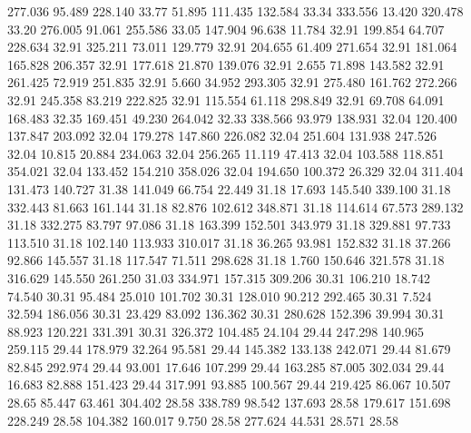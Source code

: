  277.036   95.489  228.140        33.77
  51.895  111.435  132.584        33.34
 333.556   13.420  320.478        33.20
 276.005   91.061  255.586        33.05
 147.904   96.638   11.784        32.91
 199.854   64.707  228.634        32.91
 325.211   73.011  129.779        32.91
 204.655   61.409  271.654        32.91
 181.064  165.828  206.357        32.91
 177.618   21.870  139.076        32.91
   2.655   71.898  143.582        32.91
 261.425   72.919  251.835        32.91
   5.660   34.952  293.305        32.91
 275.480  161.762  272.266        32.91
 245.358   83.219  222.825        32.91
 115.554   61.118  298.849        32.91
  69.708   64.091  168.483        32.35
 169.451   49.230  264.042        32.33
 338.566   93.979  138.931        32.04
 120.400  137.847  203.092        32.04
 179.278  147.860  226.082        32.04
 251.604  131.938  247.526        32.04
  10.815   20.884  234.063        32.04
 256.265   11.119   47.413        32.04
 103.588  118.851  354.021        32.04
 133.452  154.210  358.026        32.04
 194.650  100.372   26.329        32.04
 311.404  131.473  140.727        31.38
 141.049   66.754   22.449        31.18
  17.693  145.540  339.100        31.18
 332.443   81.663  161.144        31.18
  82.876  102.612  348.871        31.18
 114.614   67.573  289.132        31.18
 332.275   83.797   97.086        31.18
 163.399  152.501  343.979        31.18
 329.881   97.733  113.510        31.18
 102.140  113.933  310.017        31.18
  36.265   93.981  152.832        31.18
  37.266   92.866  145.557        31.18
 117.547   71.511  298.628        31.18
   1.760  150.646  321.578        31.18
 316.629  145.550  261.250        31.03
 334.971  157.315  309.206        30.31
 106.210   18.742   74.540        30.31
  95.484   25.010  101.702        30.31
 128.010   90.212  292.465        30.31
   7.524   32.594  186.056        30.31
  23.429   83.092  136.362        30.31
 280.628  152.396   39.994        30.31
  88.923  120.221  331.391        30.31
 326.372  104.485   24.104        29.44
 247.298  140.965  259.115        29.44
 178.979   32.264   95.581        29.44
 145.382  133.138  242.071        29.44
  81.679   82.845  292.974        29.44
  93.001   17.646  107.299        29.44
 163.285   87.005  302.034        29.44
  16.683   82.888  151.423        29.44
 317.991   93.885  100.567        29.44
 219.425   86.067   10.507        28.65
  85.447   63.461  304.402        28.58
 338.789   98.542  137.693        28.58
 179.617  151.698  228.249        28.58
 104.382  160.017    9.750        28.58
 277.624   44.531   28.571        28.58
